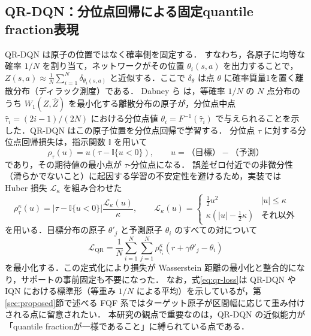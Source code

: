 \documentclass[a4paper,10pt]{jsarticle}
\theoremstyle{definition}
\newcommand{\Wone}{W_1}
\newcommand{\Finv}{F^{-1}}
\begin{document}
\subsection{QR-DQN：分位点回帰による固定quantile fraction表現}
QR-DQN \cite{dabney2018qrdqn} は原子の位置ではなく確率側を固定する．
すなわち，各原子に均等な確率 $1/N$ を割り当て，ネットワークがその位置 $\theta_i(s,a)$ を出力することで，$Z(s,a)\approx\frac1N\sum_{i=1}^N\delta_{\theta_i(s,a)}$ と近似する．ここで $\delta_\theta$ は点 $\theta$ に確率質量1を置く離散分布（ディラック測度）である．
Dabney ら \cite{dabney2018qrdqn} は，等確率 $1/N$ の $N$ 点分布のうち $\Wone(Z,\hat Z)$ を最小化する離散分布の原子が，分位点中点 $\hat\tau_i=(2i-1)/(2N)$ における分位点値
$\theta_i=\Finv(\hat\tau_i)$ で与えられることを示した．QR-DQN はこの原子位置を分位点回帰で学習する．
分位点 $\tau$ に対する分位点回帰損失は，指示関数 $\mathbb{I}$ を用いて
\begin{equation}
  \rho_\tau(u)=u\left(\tau-\mathbb{I}\{u<0\}\right),\qquad u=\text{（目標）}-\text{（予測）}
\end{equation}
であり，その期待値の最小点が $\tau$-分位点になる．
誤差ゼロ付近での非微分性（滑らかでないこと）に起因する学習の不安定性を避けるため，実装では Huber 損失 $\mathcal{L}_\kappa$ を組み合わせた
\begin{equation}
  \rho^\kappa_\tau(u)=\left|\tau-\mathbb{I}\{u<0\}\right|\frac{\mathcal{L}_\kappa(u)}{\kappa},\qquad
  \mathcal{L}_\kappa(u)=\begin{cases}\tfrac12u^2 & |u|\le\kappa\\ \kappa(|u|-\tfrac12\kappa)& \text{それ以外}\end{cases}
  \label{eq:huber-quantile}
\end{equation}
を用いる．目標分布の原子 $\theta'_j$ と予測原子 $\theta_i$ のすべての対について
\begin{equation}
  \mathcal{L}_{\mathrm{QR}}=\frac1N\sum_{i=1}^N\sum_{j=1}^N\rho^\kappa_{\hat\tau_i}\!\left(r+\gamma\theta'_j-\theta_i\right)
  \label{eq:qr-loss}
\end{equation}
を最小化する．この定式化により損失が Wasserstein 距離の最小化と整合的になり，サポートの事前固定も不要になった．
なお，式\eqref{eq:qr-loss}は QR-DQN や IQN における標準形（等重み $1/N$ による平均）を示しているが，第\ref{sec:proposed}節で述べる FQF 系ではターゲット原子が区間幅に応じて重み付けされる点に留意されたい．
本研究の観点で重要なのは，QR-DQN の近似能力が「quantile fractionが一様であること」に縛られている点である．
\end{document}
